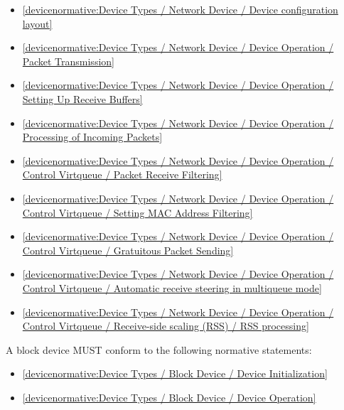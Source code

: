 \begin{itemize}
\item \ref{devicenormative:Device Types / Network Device / Device configuration layout}
\item \ref{devicenormative:Device Types / Network Device / Device Operation / Packet Transmission}
\item \ref{devicenormative:Device Types / Network Device / Device Operation / Setting Up Receive Buffers}
\item \ref{devicenormative:Device Types / Network Device / Device Operation / Processing of Incoming Packets}
\item \ref{devicenormative:Device Types / Network Device / Device Operation / Control Virtqueue / Packet Receive Filtering}
\item \ref{devicenormative:Device Types / Network Device / Device Operation / Control Virtqueue / Setting MAC Address Filtering}
\item \ref{devicenormative:Device Types / Network Device / Device Operation / Control Virtqueue / Gratuitous Packet Sending}
\item \ref{devicenormative:Device Types / Network Device / Device Operation / Control Virtqueue / Automatic receive steering in multiqueue mode}
\item \ref{devicenormative:Device Types / Network Device / Device Operation / Control Virtqueue / Receive-side scaling (RSS) / RSS processing}
\end{itemize}

\label{sec:Conformance / Device Conformance / Block Device Conformance}

A block device MUST conform to the following normative statements:

\begin{itemize}
\item \ref{devicenormative:Device Types / Block Device / Device Initialization}
\item \ref{devicenormative:Device Types / Block Device / Device Operation}
\end{itemize}

\label{sec:Conformance / Device Conformance / Console Device Conformance}

